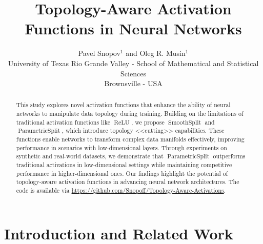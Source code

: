 \documentclass{esannV2}
\DeclareMathOperator{\relu}{\mathrm{ReLU}}
\DeclareMathOperator{\smoothsplit}{\mathrm{SmoothSplit}}
\DeclareMathOperator{\parametricsplit}{\mathrm{ParametricSplit}}
\begin{document}
\title{Topology-Aware Activation Functions in Neural Networks}

\author{Pavel Snopov$^1$ and Oleg R. Musin$^1$
  \vspace{.3cm}\\
  University of Texas Rio Grande Valley - School of Mathematical and Statistical Sciences \\
  Brownsville - USA
}

\maketitle

\begin{abstract}
  This study explores novel activation functions that enhance the ability of neural networks to manipulate data topology during training. Building on the limitations of traditional activation functions like \( \relu \), we propose \( \smoothsplit \) and \( \parametricsplit \), which introduce topology <<cutting>> capabilities. These functions enable networks to transform complex data manifolds effectively, improving performance in scenarios with low-dimensional layers. Through experiments on synthetic and real-world datasets, we demonstrate that \( \parametricsplit \) outperforms traditional activations in low-dimensional settings while maintaining competitive performance in higher-dimensional ones. Our findings highlight the potential of topology-aware activation functions in advancing neural network architectures. The code is available via \url{https://github.com/Snopoff/Topology-Aware-Activations}.
\end{abstract}

\section{Introduction and Related Work}
\end{document}
